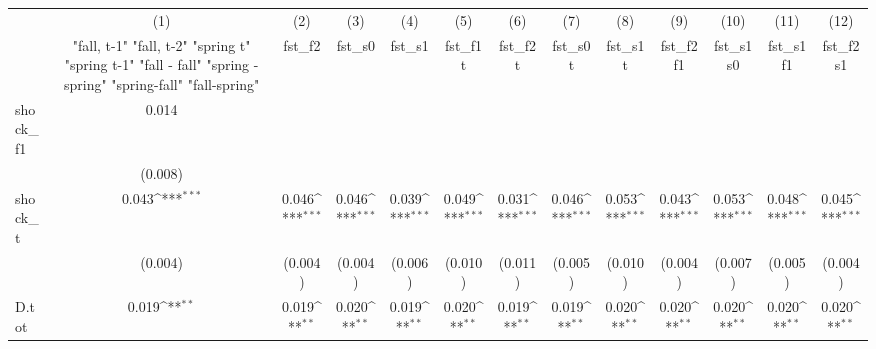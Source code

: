 {
\def\sym#1{\ifmmode^{#1}\else\(^{#1}\)\fi}
\begin{tabular}{l*{12}{c}}
\toprule
            &\multicolumn{1}{c}{(1)}&\multicolumn{1}{c}{(2)}&\multicolumn{1}{c}{(3)}&\multicolumn{1}{c}{(4)}&\multicolumn{1}{c}{(5)}&\multicolumn{1}{c}{(6)}&\multicolumn{1}{c}{(7)}&\multicolumn{1}{c}{(8)}&\multicolumn{1}{c}{(9)}&\multicolumn{1}{c}{(10)}&\multicolumn{1}{c}{(11)}&\multicolumn{1}{c}{(12)}\\
            &\multicolumn{1}{c}{  "fall, t-1" "fall, t-2" "spring t" "spring t-1"  "fall - fall" "spring - spring" "spring-fall" "fall-spring" }&\multicolumn{1}{c}{fst\_f2}&\multicolumn{1}{c}{fst\_s0}&\multicolumn{1}{c}{fst\_s1}&\multicolumn{1}{c}{fst\_f1t}&\multicolumn{1}{c}{fst\_f2t}&\multicolumn{1}{c}{fst\_s0t}&\multicolumn{1}{c}{fst\_s1t}&\multicolumn{1}{c}{fst\_f2f1}&\multicolumn{1}{c}{fst\_s1s0}&\multicolumn{1}{c}{fst\_s1f1}&\multicolumn{1}{c}{fst\_f2s1}\\
\midrule
shock\_f1    &       0.014         &                     &                     &                     &                     &                     &                     &                     &                     &                     &                     &                     \\
            &     (0.008)         &                     &                     &                     &                     &                     &                     &                     &                     &                     &                     &                     \\
\addlinespace
shock\_t     &       0.043\sym{***}&       0.046\sym{***}&       0.046\sym{***}&       0.039\sym{***}&       0.049\sym{***}&       0.031\sym{***}&       0.046\sym{***}&       0.053\sym{***}&       0.043\sym{***}&       0.053\sym{***}&       0.048\sym{***}&       0.045\sym{***}\\
            &     (0.004)         &     (0.004)         &     (0.004)         &     (0.006)         &     (0.010)         &     (0.011)         &     (0.005)         &     (0.010)         &     (0.004)         &     (0.007)         &     (0.005)         &     (0.004)         \\
\addlinespace
D.tot       &       0.019\sym{**} &       0.019\sym{**} &       0.020\sym{**} &       0.019\sym{**} &       0.020\sym{**} &       0.019\sym{**} &       0.019\sym{**} &       0.020\sym{**} &       0.020\sym{**} &       0.020\sym{**} &       0.020\sym{**} &       0.020\sym{**} \\

\end{tabular}}

